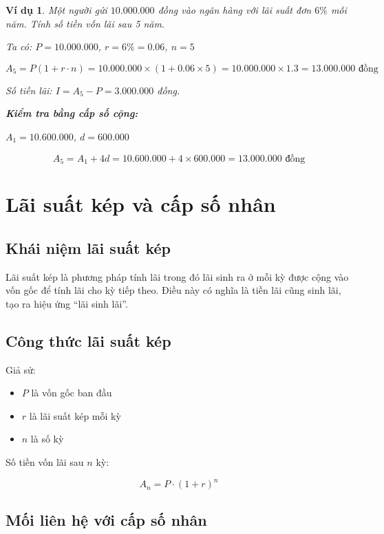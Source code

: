 \documentclass[12pt,a4paper]{report}
\newtheorem{example}{Ví dụ}[section]
\begin{document}
\begin{example}
    Một người gửi $10.000.000$ đồng vào ngân hàng với lãi suất đơn $6\%$ mỗi năm. Tính số tiền vốn lãi sau 5 năm.
    
    Ta có:
    $P = 10.000.000$,
    $r = 6\% = 0.06$,
    $n = 5$
    
    \[
        A_5
        = P(1 + r \cdot n)
        = 10.000.000 \times (1 + 0.06 \times 5)
        = 10.000.000 \times 1.3
        = 13.000.000 \text{ đồng}
    \]
    
    Số tiền lãi:
    $I = A_5 - P = 3.000.000$ đồng.
    
    \textbf{Kiểm tra bằng cấp số cộng:}
    
    $A_1 = 10.600.000$, $d = 600.000$
    
    \[
        A_5 = A_1 + 4d
        = 10.600.000 + 4 \times 600.000
        = 13.000.000 \text{ đồng}
    \]
\end{example}

\section{Lãi suất kép và cấp số nhân}

\subsection{Khái niệm lãi suất kép}

Lãi suất kép là phương pháp tính lãi trong đó lãi sinh ra ở mỗi kỳ được cộng vào vốn gốc để tính lãi cho kỳ tiếp theo. Điều này có nghĩa là tiền lãi cũng sinh lãi, tạo ra hiệu ứng ``lãi sinh lãi''.

\subsection{Công thức lãi suất kép}

Giả sử:

\begin{itemize}[label=\textbullet]
    \item $P$ là vốn gốc ban đầu
    \item $r$ là lãi suất kép mỗi kỳ
    \item $n$ là số kỳ
\end{itemize}

Số tiền vốn lãi sau $n$ kỳ:

\[
    A_n = P \cdot (1 + r)^n
\]

\subsection{Mối liên hệ với cấp số nhân}
\end{document}
